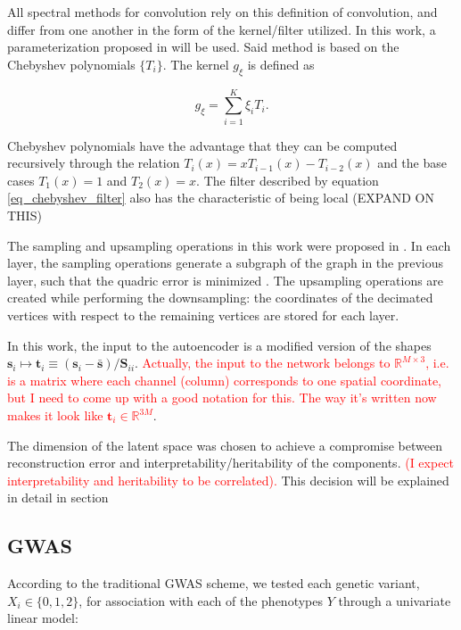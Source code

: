 \documentclass[twocolumn]{llncs}
\begin{document}
All spectral methods for convolution rely on this definition of convolution, and differ from one another in the form of the kernel/filter utilized. In this work, a parameterization proposed in \cite{ref_spectral_graph_conv} will be used. 
Said method is based on the Chebyshev polynomials $\{T_i\}$. The kernel $g_\xi$ is defined as

\begin{equation}
g_{\xi}=\sum_{i=1}^{K}\xi_i T_i.
\label{eq_chebyshev_filter}
\end{equation}

Chebyshev polynomials have the advantage that they can be computed recursively through the relation $T_i(x)=xT_{i-1}(x)-T_{i-2}(x)$ and the base cases $T_1(x)=1$ and $T_2(x)=x$. The filter described by equation \ref{eq_chebyshev_filter} also has the characteristic of being local (EXPAND ON THIS)

The sampling and upsampling operations in this work were proposed in \cite{ref_coma}. In each layer, the sampling operations generate a subgraph of the graph in the previous layer, such that the quadric error is minimized \cite{ref_quadric_error}. The upsampling operations are created while performing the downsampling: the coordinates of the decimated vertices with respect to the remaining vertices are stored for each layer.

In this work, the input to the autoencoder is a modified version of the shapes $\textbf{s}_i\mapsto \textbf{t}_i\equiv(\textbf{s}_i-\bar{\textbf{s}})/\textbf{S}_{ii}$. \textcolor{red}{Actually, the input to the network belongs to $\mathbb{R}^{M\times 3}$, i.e. is a matrix where each channel  (column) corresponds to one spatial coordinate, but I need to come up with a good notation for this. The way it's written now makes it look like $\textbf{t}_i\in\mathbb{R}^{3M}$}.

The dimension of the latent space was chosen to achieve a compromise between reconstruction error and interpretability/heritability of the components. \textcolor{red}{(I expect interpretability and heritability to be correlated).} This decision will be explained in detail in section \ 

\subsection{GWAS}
According to the traditional GWAS scheme, we tested each genetic variant, $X_i\in\{0,1,2\}$, for association with each of the phenotypes $Y$ through a univariate linear model:
\end{document}
